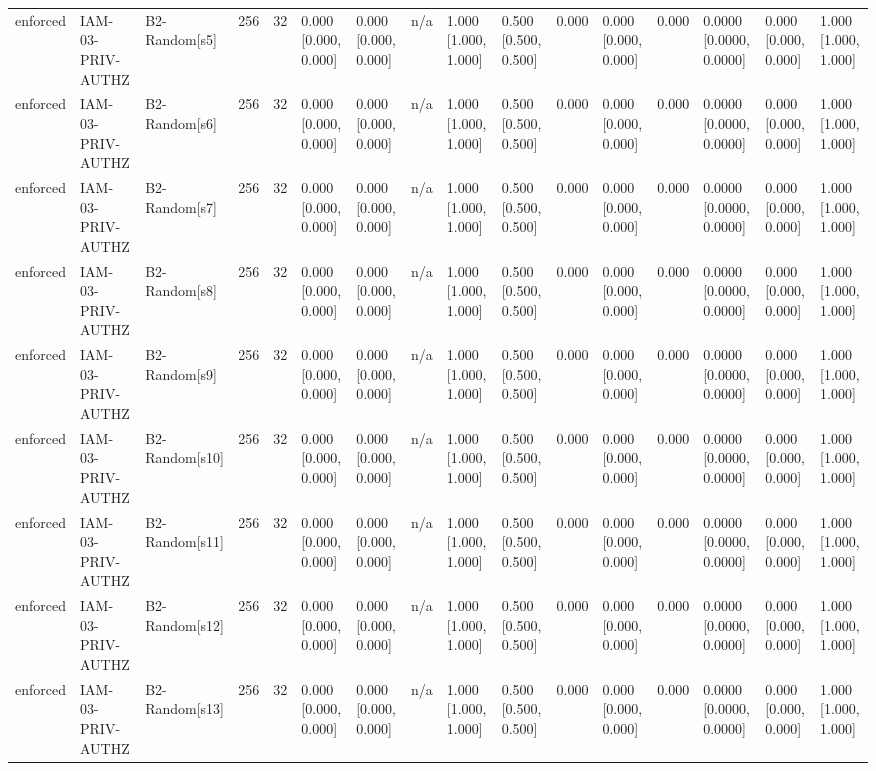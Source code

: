 \begin{table}[!ht]
{\begin{tabular}{llllllllllllllll}
enforced & IAM-03-PRIV-AUTHZ & B2-Random[s5] & 256 & 32 & 0.000 [0.000, 0.000] & 0.000 [0.000, 0.000] & n/a & 1.000 [1.000, 1.000] & 0.500 [0.500, 0.500] & 0.000 & 0.000 [0.000, 0.000] & 0.000 & 0.0000 [0.0000, 0.0000] & 0.000 [0.000, 0.000] & 1.000 [1.000, 1.000] \\
enforced & IAM-03-PRIV-AUTHZ & B2-Random[s6] & 256 & 32 & 0.000 [0.000, 0.000] & 0.000 [0.000, 0.000] & n/a & 1.000 [1.000, 1.000] & 0.500 [0.500, 0.500] & 0.000 & 0.000 [0.000, 0.000] & 0.000 & 0.0000 [0.0000, 0.0000] & 0.000 [0.000, 0.000] & 1.000 [1.000, 1.000] \\
enforced & IAM-03-PRIV-AUTHZ & B2-Random[s7] & 256 & 32 & 0.000 [0.000, 0.000] & 0.000 [0.000, 0.000] & n/a & 1.000 [1.000, 1.000] & 0.500 [0.500, 0.500] & 0.000 & 0.000 [0.000, 0.000] & 0.000 & 0.0000 [0.0000, 0.0000] & 0.000 [0.000, 0.000] & 1.000 [1.000, 1.000] \\
enforced & IAM-03-PRIV-AUTHZ & B2-Random[s8] & 256 & 32 & 0.000 [0.000, 0.000] & 0.000 [0.000, 0.000] & n/a & 1.000 [1.000, 1.000] & 0.500 [0.500, 0.500] & 0.000 & 0.000 [0.000, 0.000] & 0.000 & 0.0000 [0.0000, 0.0000] & 0.000 [0.000, 0.000] & 1.000 [1.000, 1.000] \\
enforced & IAM-03-PRIV-AUTHZ & B2-Random[s9] & 256 & 32 & 0.000 [0.000, 0.000] & 0.000 [0.000, 0.000] & n/a & 1.000 [1.000, 1.000] & 0.500 [0.500, 0.500] & 0.000 & 0.000 [0.000, 0.000] & 0.000 & 0.0000 [0.0000, 0.0000] & 0.000 [0.000, 0.000] & 1.000 [1.000, 1.000] \\
enforced & IAM-03-PRIV-AUTHZ & B2-Random[s10] & 256 & 32 & 0.000 [0.000, 0.000] & 0.000 [0.000, 0.000] & n/a & 1.000 [1.000, 1.000] & 0.500 [0.500, 0.500] & 0.000 & 0.000 [0.000, 0.000] & 0.000 & 0.0000 [0.0000, 0.0000] & 0.000 [0.000, 0.000] & 1.000 [1.000, 1.000] \\
enforced & IAM-03-PRIV-AUTHZ & B2-Random[s11] & 256 & 32 & 0.000 [0.000, 0.000] & 0.000 [0.000, 0.000] & n/a & 1.000 [1.000, 1.000] & 0.500 [0.500, 0.500] & 0.000 & 0.000 [0.000, 0.000] & 0.000 & 0.0000 [0.0000, 0.0000] & 0.000 [0.000, 0.000] & 1.000 [1.000, 1.000] \\
enforced & IAM-03-PRIV-AUTHZ & B2-Random[s12] & 256 & 32 & 0.000 [0.000, 0.000] & 0.000 [0.000, 0.000] & n/a & 1.000 [1.000, 1.000] & 0.500 [0.500, 0.500] & 0.000 & 0.000 [0.000, 0.000] & 0.000 & 0.0000 [0.0000, 0.0000] & 0.000 [0.000, 0.000] & 1.000 [1.000, 1.000] \\
enforced & IAM-03-PRIV-AUTHZ & B2-Random[s13] & 256 & 32 & 0.000 [0.000, 0.000] & 0.000 [0.000, 0.000] & n/a & 1.000 [1.000, 1.000] & 0.500 [0.500, 0.500] & 0.000 & 0.000 [0.000, 0.000] & 0.000 & 0.0000 [0.0000, 0.0000] & 0.000 [0.000, 0.000] & 1.000 [1.000, 1.000] \\

\end{tabular}}
\end{table}
